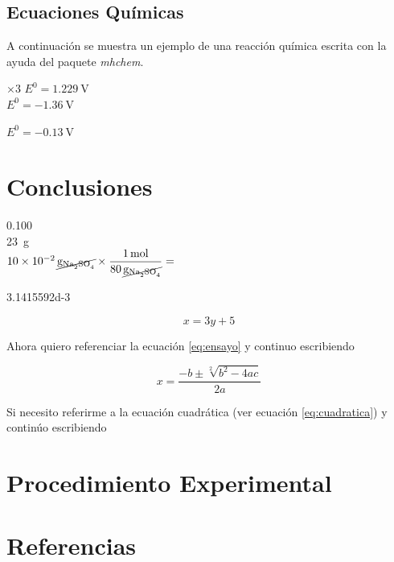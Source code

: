 \documentclass[12pt,letterpaper]{article}
\begin{document}
\subsection{Ecuaciones Químicas}

A continuación se muestra un ejemplo de una reacción química escrita con la ayuda del paquete \textit{mhchem}.

\begin{center}
 \hspace{19mm} $\times 3$ \hspace{20mm} $E^0 = \SI{1.229}{\volt}$\\
\vspace{3mm}
 \hspace{24mm} $E^0 = \SI{-1.36}{\volt}$\\
\underline{\hspace{145mm}}

 \hspace{15mm} $E^0 = \SI{-0.13}{\volt}$\\
\end{center}

\section{Conclusiones\label{sec:conclusions}}

\SI{0.100}{\Molar} \\



\SI{23}{\gram}\\

$\SI{10d-2}{\cancel\gram\of{\ce{Na2SO4}}} \times \dfrac{\SI{1}{\mole}}{\SI{80}{\cancel\gram\of{\ce{Na2SO4}}}} = $

\num{3.1415592d-3}

\begin{equation}
\label{eq:ensayo}
x=3y+5
\end{equation}

Ahora quiero referenciar la ecuación \ref{eq:ensayo} y continuo escribiendo


\begin{equation}
\label{eq:cuadratica}
x=\frac { -b\pm \sqrt [ 2 ]{ { b }^{ 2 }-4ac }  }{ 2a } 
\end{equation}

Si necesito referirme a la ecuación cuadrática (ver ecuación \ref{eq:cuadratica}) y continúo escribiendo


\section{Procedimiento Experimental\label{sec:procedure}}

\section{Referencias\label{sec:references}}


\printbibliography[heading=none]
		
\end{document}
